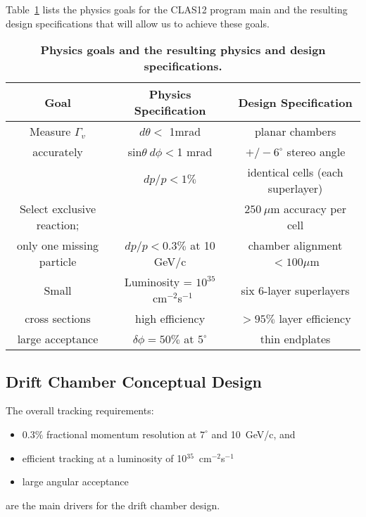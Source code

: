 Table~\ref{fwd-dc-physics-specifications} lists the physics goals for the CLAS12 program
main and the resulting design specifications that will allow us to achieve these goals.


\small{
\begin{table}[ht]
\begin{center}
\begin{tabular}{||c|c|c||} \hline \hline
   {\bf Goal}         & {\bf Physics Specification} & {\bf Design Specification}\\ \hline
Measure $\Gamma_v$  & $d \theta <$ 1mrad   & planar chambers \\ 
accurately  & sin$\theta ~d \phi < $1 mrad & $+/- 6^\circ$ stereo angle   \\ 
  & $dp/p < 1\% $ & identical cells (each superlayer)  \\ \hline
Select exclusive reaction; &    & $250~\mu$m  accuracy per cell\\ 
only one missing particle    & $dp/p < 0.3\%$ at 10 GeV/c &    chamber alignment $<100\mu$m\\  \hline
Small       & Luminosity = $10^{35}$~cm$^{-2}$s$^{-1}$  & six 6-layer superlayers \\ 
cross sections  & high efficiency & $> 95\%$ layer efficiency \\ \hline
large acceptance   & $\delta\phi = 50\%$ at $5^\circ$ & thin endplates\\ \hline
\end{tabular}
\caption{\small{\bf Physics goals and the resulting physics and design specifications.}}
\label{fwd-dc-physics-specifications}
\end{center}
\end{table}
}

\subsection{Drift Chamber Conceptual Design}

The overall tracking requirements:
\begin{itemize}
\item $0.3\%$ fractional momentum resolution at $7^{\circ}$ and 10~GeV/c, and 
\item efficient tracking at a luminosity of 
10$^{35}$~cm$^{-2}$s$^{-1}$
\item large angular acceptance 
\end{itemize}
are the main drivers for the drift chamber design.  

